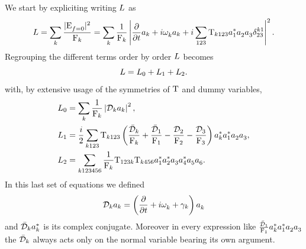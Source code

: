 We start by expliciting writing $L$ as
\begin{equation}
    L = \sum_k \frac{|\mathrm{E}_{f=0}^{}|^2}{\mathrm{F}_k} = \sum_k \frac{1}{\mathrm{F}_k} \left| \frac{\partial}{\partial t} a_k + i \omega^{}_k a_k + i \sum_{123}\mathrm{T}_{k123} a_1^{*}a_2^{}a_3^{} \delta^{k1}_{23} \right|^2.
\end{equation} 
Regrouping the different terms order by order $L$ becomes 
\begin{equation}
    L = L_0 + L_1 + L_2.
\end{equation}
with, by extensive usage of the symmetries of $\mathrm{T}$ and dummy variables, 
\begin{align}
    L_0 &= \sum_k\frac{1}{\mathrm{F}_k} \left| \mathcal{D}_k a_k  \right|^2, \\
    L_1 &= \frac{i}{2}\sum_{k123}\mathrm{T}_{k123}\left( \frac{\bar{\mathcal{D}}_k}{\mathrm{F}_k} + \frac{\bar{\mathcal{D}}_1}{\mathrm{F}_1} - \frac{\mathcal{D}_2}{\mathrm{F}_2} - \frac{\mathcal{D}_3}{\mathrm{F}_3} \right)
    a_k^{*} a_1^{*} a_2^{} a_3^{}, \\
    L_2 &= \sum_{k123456} \frac{1}{\mathrm{F}_k}\mathrm{T}_{123k}\mathrm{T}_{k456}a_1^{*} a_2^{*} a_3^{} a_4^{*} a_5^{} a_6^{}. 
\end{align}
In this last set of equations we defined 
\begin{equation}
    \mathcal{D}_k a_k = \left(\frac{\partial}{\partial t} + i\omega^{}_k+ \gamma_k\right)a_k^{}
\end{equation} 
and $\bar{\mathcal{D}}_k a_k^{*}$ is its complex conjugate. Moreover in every expression 
like $\frac{\bar{\mathcal{D}}_1}{\mathrm{F}_1}a_k^{*} a_1^{*} a_2^{} a_3^{}$ the $\bar{\mathcal{D}}_k$ always acts only on the normal variable bearing its own argument. \\

